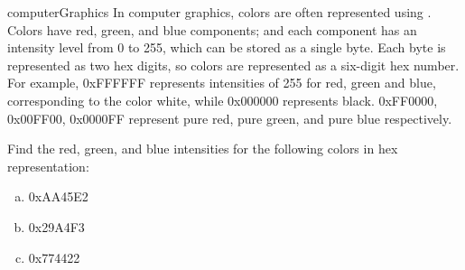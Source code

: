 \begin{exercise}{computerGraphics}
In computer graphics, colors are often represented using . Colors have red, green, and blue components; and each component has an intensity level from 0 to 255, which can be stored as a single byte. Each byte is represented as two hex digits, so colors are represented as a six-digit hex number.  For example, 0xFFFFFF represents intensities of 255 for red, green and blue, corresponding to the color white, while 0x000000 represents black.  0xFF0000, 0x00FF00, 0x0000FF represent pure red, pure green, and pure blue respectively.

Find the red, green, and blue intensities for the following colors in hex representation:
\begin{enumerate}[(a)]
\item 0xAA45E2
\item 0x29A4F3
\item 0x774422
\end{enumerate}
\end{exercise}
 